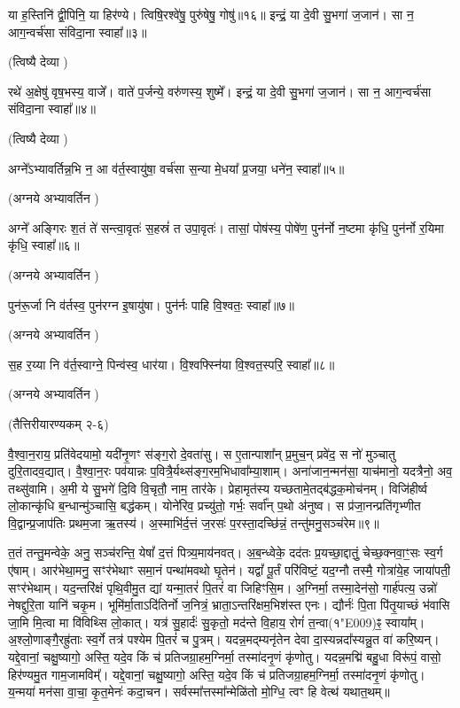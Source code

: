 या ह॒स्तिनि॑ द्वी॒पिनि॒ या हिर॑ण्ये।
त्विषि॒रश्वे॑षु॒ पुरु॑षेषु॒ गोषु॑॥१६॥
इन्द्रं॒ या दे॒वी सु॒भगा॑ ज॒जान॑।
सा न॒ आग॒न्वर्च॑सा संविदा॒ना स्वाहा᳚॥३॥

(त्विष्यै देव्या \idam)



रथे॑ अ॒क्षेषु॑ वृष॒भस्य॒ वाजे᳚।
वाते॑ प॒र्जन्ये॒ वरु॑णस्य॒ शुष्मे᳚।
इन्द्रं॒ या दे॒वी सु॒भगा॑ ज॒जान॑।
सा न॒ आग॒न्वर्च॑सा संविदा॒ना स्वाहा᳚॥४॥

(त्विष्यै देव्या \idam)


अग्ने᳚\-ऽभ्यावर्तिन्न॒भि न॒ आ व॑र्त॒स्वायु॑षा॒ वर्च॑सा स॒न्या मे॒धया᳚ प्र॒जया॒ धने॑न॒ स्वाहा᳚॥५॥

(अग्नये अभ्यावर्तिन \idam)

अग्ने᳚ अङ्गिरः श॒तं ते॑ सन्त्वा॒वृतः॑ स॒हस्रं॑ त उपा॒वृतः॑।
तासां॒ पोष॑स्य॒ पोषे॑ण॒ पुन॑र्नो न॒ष्टमा कृ॑धि॒ पुन॑र्नो र॒यिमा कृ॑धि॒ स्वाहा᳚॥६॥

(अग्नये अभ्यावर्तिन \idam)


पुन॑रू॒र्जा नि व॑र्तस्व॒ पुन॑रग्न इ॒षायु॑षा। पुन॑र्नः पाहि वि॒श्वतः॒ स्वाहा᳚॥७॥

(अग्नये अभ्यावर्तिन \idam)


स॒ह र॒य्या नि व॑र्त॒स्वाग्ने॒ पिन्व॑स्व॒ धार॑या। वि॒श्वफ्स्नि॑या वि॒श्वत॒स्परि॒ स्वाहा᳚॥८॥

(अग्नये अभ्यावर्तिन \idam)



\centerline{\scriptsize (तैत्तिरीयारण्यकम् २-६)}


वै॒श्वा॒न॒राय॒ प्रति॑वेदयामो॒ यदी॑नृ॒णꣳ स॑ङ्ग॒रो दे॒वता॑सु। 
स ए॒तान्पाशा᳚न् प्र॒मुच॒न् प्रवे॑द॒ स नो॑ मुञ्चातु दुरि॒तादव॒द्यात्। 
वै॒श्वा॒न॒रः पव॑यान्नः प॒वित्रै॒र्यथ्स॑ङ्ग॒रम॒भिधावा᳚म्या॒शाम्। 
अना॑जान॒न्मन॑सा॒ याच॑मानो॒ यदत्रैनो॒ अव॒ तथ्सु॑वामि। 
अ॒मी ये सु॒भगे॑ दि॒वि वि॒चृतौ॒ नाम॒ तार॑के। 
प्रेहामृत॑स्य यच्छतामे॒तद्ब॑द्धक॒मोच॑नम्। 
विजि॑हीर्ष्व लो॒कान्कृ॑धि ब॒न्धान्मु॑ञ्चासि॒ बद्ध॑कम्। 
योने॑रिव॒ प्रच्यु॑तो॒ गर्भः॒ सर्वा᳚न् प॒थो अ॑नुष्व। 
स प्र॑जा॒नन्प्रति॑गृभ्णीत वि॒द्वान्प्र॒जाप॑तिः प्रथम॒जा ऋ॒तस्य॑। 
अ॒स्माभि॑र्द॒त्तं ज॒रसः॑ प॒रस्ता॒दच्छि॑न्नं॒ तन्तु॑मनु॒सञ्च॑रेम॥९॥

त॒तं तन्तु॒मन्वेके॒ अनु॒ सञ्च॑रन्ति॒ येषां᳚ द॒त्तं पित्र्य॒माय॑नवत्। 
अ॒ब॒न्ध्वेके॒ दद॑तः प्र॒यच्छा॒द्दातुं॒ चेच्छ॒क्नवा॒ꣳ॒सः स्व॒र्ग ए॑षाम्। 
आर॑भेथा॒मनु॒ सꣳर॑भेथाꣳ समा॒नं पन्था॑मवथो घृ॒तेन॑। 
यद्वां᳚ पू॒र्तं परि॑विष्टं॒ यद॒ग्नौ तस्मै॒ गोत्रा॑ये॒ह जाया॑पती॒ सꣳर॑भेथाम्। 
यद॒न्तरि॑क्षं पृथि॒वीमु॒त द्यां यन्मा॒तरं॑ पि॒तरं॑ वा जिहिꣳसि॒म। 
अ॒ग्निर्मा॒ तस्मा॒देन॑सो॒ गार्\mbox{}ह॑पत्य॒ उन्नो॑ नेषद्दुरि॒ता यानि॑ चकृ॒म। 
भूमि॑र्मा॒ताऽदि॑तिर्नो ज॒नित्रं॒ भ्राता॒ऽन्तरि॑क्षम॒भिश॑स्त एनः। 
द्यौर्नः॑ पि॒ता पि॑तृ॒याच्छं भ॑वासि जा॒मि मि॒त्वा मा वि॑विथ्सि लो॒कात्। 
यत्र॑ सु॒हार्दः॑ सु॒कृतो॒ मद॑न्ते वि॒हाय॒ रोगं॑ त॒न्वा(१\char"E009)ꣴ॒ स्वाया᳚म्। 
अ॒श्लो॒णाङ्गै॒रह्रु॑ताः स्व॒र्गे तत्र॑ पश्येम पि॒तरं॑ च पु॒त्रम्। 
यदन्न॒मद्म्यनृ॑तेन देवा दा॒स्यन्नदा᳚स्यन्नु॒त वा॑ करि॒ष्यन्। 
यद्दे॒वानां॒ चक्षु॒ष्यागो॒ अस्ति॒ यदे॒व किं च॑ प्रतिजग्रा॒हम॒ग्निर्मा॒ तस्मा॑दनृ॒णं कृ॑णोतु। 
यदन्न॒मद्मि॑ बहु॒धा विरू॑पं॒ वासो॒ हिर॑ण्यमु॒त गाम॒जामविम्᳚। 
यद्दे॒वानां॒ चक्षु॒ष्यागो॒ अस्ति॒ यदे॒व किं च॑ प्रतिजग्रा॒हम॒ग्निर्मा॒ तस्मा॑दनृ॒णं कृ॑णोतु। 
य॒न्मया॑ मन॑सा वा॒चा॒ कृ॒त॒मेनः॑ कदा॒चन। 
सर्वस्मा᳚त्तस्मा᳚न्मेळि॑तो मो॒ग्धि॒ त्वꣳ हि वेत्थ॑ यथात॒थम्॥

